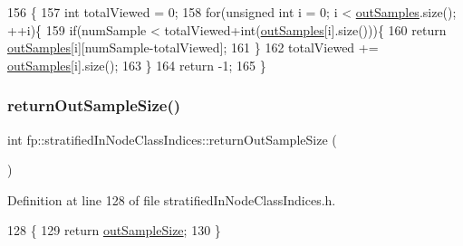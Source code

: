 \begin{DoxyCode}
156                                                            \{
157                 \textcolor{keywordtype}{int} totalViewed = 0;
158                 \textcolor{keywordflow}{for}(\textcolor{keywordtype}{unsigned} \textcolor{keywordtype}{int} i = 0; i < \hyperlink{classfp_1_1stratifiedInNodeClassIndices_aa569f727e65e0b4b0815e71c1ee819e8}{outSamples}.size(); ++i)\{
159                     \textcolor{keywordflow}{if}(numSample < totalViewed+\textcolor{keywordtype}{int}(\hyperlink{classfp_1_1stratifiedInNodeClassIndices_aa569f727e65e0b4b0815e71c1ee819e8}{outSamples}[i].size()))\{
160                         \textcolor{keywordflow}{return} \hyperlink{classfp_1_1stratifiedInNodeClassIndices_aa569f727e65e0b4b0815e71c1ee819e8}{outSamples}[i][numSample-totalViewed];
161                     \}
162                     totalViewed += \hyperlink{classfp_1_1stratifiedInNodeClassIndices_aa569f727e65e0b4b0815e71c1ee819e8}{outSamples}[i].size();
163                 \}
164                 \textcolor{keywordflow}{return} -1;
165             \}
\end{DoxyCode}
\mbox{\label{classfp_1_1stratifiedInNodeClassIndices_a6630b77af340d2023d88bafa87b94cae}} 
\subsubsection{\texorpdfstring{return\+Out\+Sample\+Size()}{returnOutSampleSize()}}
{\footnotesize\ttfamily int fp\+::stratified\+In\+Node\+Class\+Indices\+::return\+Out\+Sample\+Size (\begin{DoxyParamCaption}{ }\end{DoxyParamCaption})\hspace{0.3cm}{\ttfamily [inline]}}



Definition at line 128 of file stratified\+In\+Node\+Class\+Indices.\+h.


\begin{DoxyCode}
128                                             \{
129                 \textcolor{keywordflow}{return} \hyperlink{classfp_1_1stratifiedInNodeClassIndices_aa947b545e6751902344e832fcc1c9641}{outSampleSize};
130             \}
\end{DoxyCode}
\mbox{\label{classfp_1_1stratifiedInNodeClassIndices_af740a8054cefe977f8f1288fc6b39109}} 
